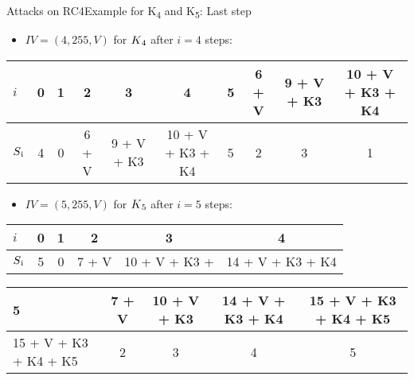 \documentclass[
	aspectratio=169,	%
	onlytextwidth,		%
	t,					%
	]{beamer}
\begin{document}
\begin{frame}[fragile]{Attacks on RC4}{Example for K\textsubscript{4} and K\textsubscript{5}: Last step}
	\begin{itemize}
		\item $IV = (4,255,V)$ for $K\textsubscript{4}$ after $i=4$ steps:
	\end{itemize}

	\small
	
	\begin{table}[h!]
		\begin{center}
			\begin{tabular}{l|c|c|c|c|c|c|c|c|c}
			$i$ & 0 & 1 & 2 & 3 & 4 & 5 & 6 + V & 9 + V + K3 & 10 + V + K3 + K4\\
			\hline
			$S\textsubscript{i}$ & 4 & 0 & 6 + V & 9 + V + K3 & 10 + V + K3 + K4 & 5 & 2 & 3 & 1\\
			\end{tabular}
		\end{center}
	\end{table}

	\normalsize

	\begin{itemize}
		\item $IV = (5,255,V)$ for $K\textsubscript{5}$ after $i=5$ steps:
	\end{itemize}

	\small

	\begin{table}[h!]
		\begin{center}
			\begin{tabular}{l|c|c|c|c|c}
			$i$ & 0 & 1 & 2 & 3 & 4\\
			\hline
			$S\textsubscript{i}$ & 5 & 0 & 7 + V & 10 + V + K3 + & 14 + V + K3 + K4\\
			\end{tabular}
		\end{center}
	\end{table}

	\begin{table}[h!]
		\begin{center}
			\begin{tabular}{l|c|c|c|c}
			5 & 7 + V & 10 + V + K3 & 14 + V + K3 + K4 & 15 + V + K3 + K4 + K5\\
			\hline
			15 + V + K3 + K4 + K5 & 2 & 3 & 4 & 5\\
			\end{tabular}
		\end{center}
	\end{table}

	\normalsize

\end{frame}
\end{document}
